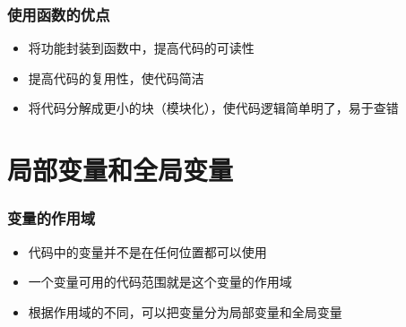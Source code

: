 \begin{frame}[fragile]
    \frametitle{使用函数的优点}

        \begin{itemize}
            \item 将功能封装到函数中，提高代码的可读性
            \item 提高代码的复用性，使代码简洁
            \item 将代码分解成更小的块（模块化），使代码逻辑简单明了，易于查错
        \end{itemize}
    
\end{frame}

\section{局部变量和全局变量}

\begin{frame}[fragile]
    \frametitle{变量的作用域}

        \begin{itemize}
            \item 代码中的变量并不是在任何位置都可以使用
            \item 一个变量可用的代码范围就是这个变量的作用域
            \item 根据作用域的不同，可以把变量分为局部变量和全局变量
        \end{itemize}
    
\end{frame}

